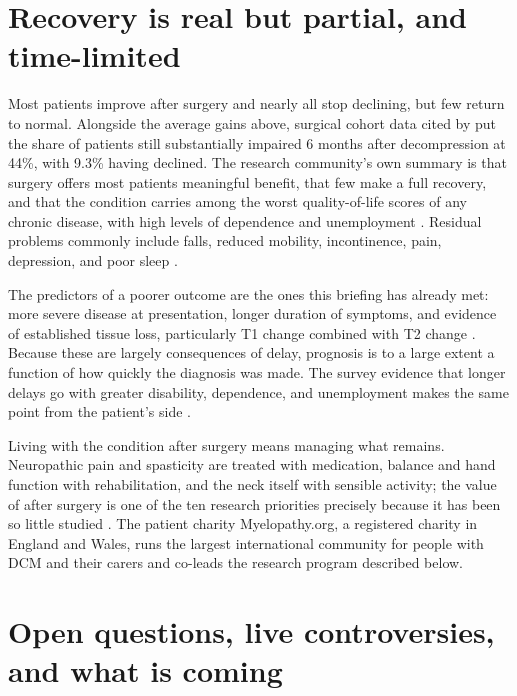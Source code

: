 \documentclass[11pt, letterpaper]{article}
\begin{document}
\section{Recovery is real but partial, and time-limited}

Most patients improve after surgery and nearly all stop declining, but few return to normal. Alongside the average gains above, surgical cohort data cited by \citet{karadimas2015} put the share of patients still substantially impaired 6 months after decompression at 44\%, with 9.3\% having declined. The research community's own summary is that surgery offers most patients meaningful benefit, that few make a full recovery, and that the condition carries among the worst quality-of-life scores of any chronic disease, with high levels of dependence and unemployment \citep{davies2022why}. Residual problems commonly include falls, reduced mobility, incontinence, pain, depression, and poor sleep \citep{davies2018}.

The predictors of a poorer outcome are the ones this briefing has already met: more severe disease at presentation, longer duration of symptoms, and  evidence of established tissue loss, particularly T1 change combined with T2 change \citep{tetreault2019,tetreault2013mri}. Because these are largely consequences of delay, prognosis is to a large extent a function of how quickly the diagnosis was made. The survey evidence that longer delays go with greater disability, dependence, and unemployment makes the same point from the patient's side \citep{pope2020delays}.

Living with the condition after surgery means managing what remains. Neuropathic pain and \gls{spasticity} are treated with medication, balance and hand function with rehabilitation, and the neck itself with sensible activity; the value of  after surgery is one of the ten research priorities precisely because it has been so little studied \citep{davies2022why}. The patient charity Myelopathy.org, a registered charity in England and Wales, runs the largest international community for people with DCM and their carers and co-leads the research program described below.

\section{Open questions, live controversies, and what is coming}
\end{document}
